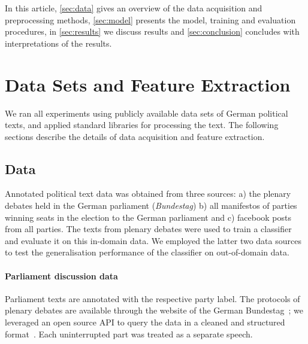 \documentclass[11pt]{article}
\begin{document}
In this article, \autoref{sec:data} gives an overview of the data acquisition and preprocessing methods, \autoref{sec:model} presents the model, training and evaluation procedures, in \autoref{sec:results} we discuss results and \autoref{sec:conclusion} concludes with interpretations of the results.

\section{Data Sets and Feature Extraction}\label{sec:data}
%
We ran all experiments using publicly available data sets of German political texts, and applied standard libraries for processing the text. The following sections describe the details of data acquisition and feature extraction.

\subsection{Data}
Annotated political text data was obtained from three sources: a) the plenary debates held in the German parliament ({\em Bundestag}) b) all manifestos of parties winning seats in the election to the German parliament and c) facebook posts from all parties. The texts from plenary debates were used to train a classifier and evaluate it on this in-domain data. We employed the latter two data sources to test the generalisation performance of the classifier on out-of-domain data. 

\paragraph{Parliament discussion data} Parliament texts are annotated with the respective party label. The protocols of plenary debates are available through the website of the German Bundestag~\cite{bundestag}; we leveraged an open source API to query the data in a cleaned and structured format~\cite{bundestag-github}. Each uninterrupted part was treated as a separate speech. 
\end{document}
